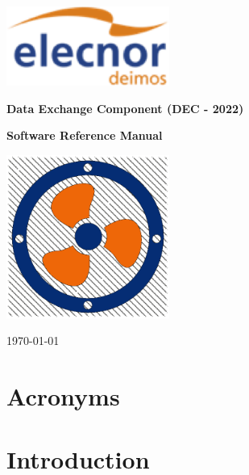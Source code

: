 \documentclass[
	oneside,
	openany,
	a4paper,
	headings=optiontoheadandtoc
	]{book}
\begin{document}

\begin{titlepage}
	\begin{center}
		
		\includegraphics[width=0.4\textwidth]{logo_elecnor_deimos.png}
		
		\vspace*{1cm}
		\Large
		\textbf{Data Exchange Component (DEC - 2022)}
		
		\textbf{Software Reference Manual}
		
		\vspace*{1cm}
		
		\includegraphics[width=0.4\textwidth]{DEC_Logo_White.png}
		
		\vspace{0.8cm}
		
		\today
		
	\end{center}
\end{titlepage}
	


\tableofcontents
\newpage

\chapter{Acronyms}
 
\newpage
 
\chapter{Introduction}

\newpage
\end{document}
